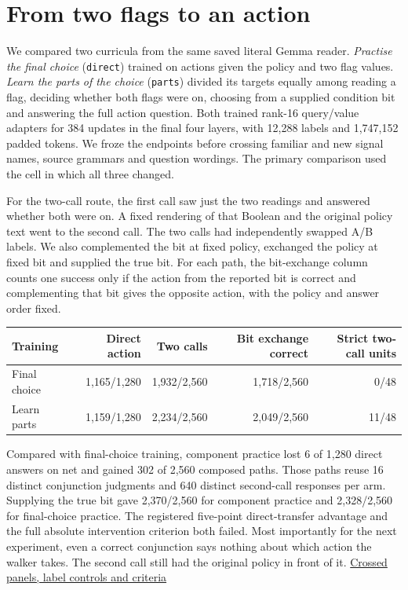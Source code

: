 \documentclass[11pt]{article}
\begin{document}
\section{From two flags to an action}

We compared two curricula from the same saved literal Gemma reader. \emph{Practise the final choice} (\texttt{direct}) trained on actions given the policy and two flag values. \emph{Learn the parts of the choice} (\texttt{parts}) divided its targets equally among reading a flag, deciding whether both flags were on, choosing from a supplied condition bit and answering the full action question. Both trained rank-16 query/value adapters for 384 updates in the final four layers, with 12,288 labels and 1,747,152 padded tokens. We froze the endpoints before crossing familiar and new signal names, source grammars and question wordings. The primary comparison used the cell in which all three changed.

For the two-call route, the first call saw just the two readings and answered whether both were on. A fixed rendering of that Boolean and the original policy text went to the second call. The two calls had independently swapped A/B labels. We also complemented the bit at fixed policy, exchanged the policy at fixed bit and supplied the true bit. For each path, the bit-exchange column counts one success only if the action from the reported bit is correct and complementing that bit gives the opposite action, with the policy and answer order fixed.

\begin{center}
\small\renewcommand{\arraystretch}{1.15}
\begin{tabular}{@{}lrrrr@{}}
\toprule
Training & Direct action & Two calls & Bit exchange correct & Strict two-call units \\
\midrule
Final choice & 1,165/1,280 & 1,932/2,560 & 1,718/2,560 & 0/48 \\
Learn parts & 1,159/1,280 & 2,234/2,560 & 2,049/2,560 & 11/48 \\
\bottomrule
\end{tabular}
\end{center}

Compared with final-choice training, component practice lost 6 of 1,280 direct answers on net and gained 302 of 2,560 composed paths. Those paths reuse 16 distinct conjunction judgments and 640 distinct second-call responses per arm. Supplying the true bit gave 2,370/2,560 for component practice and 2,328/2,560 for final-choice practice. The registered five-point direct-transfer advantage and the full absolute intervention criterion both failed. Most importantly for the next experiment, even a correct conjunction says nothing about which action the walker takes. The second call still had the original policy in front of it. \href{https://github.com/RyoSpiralArchitect/self-fold/blob/v1.0.0/provenance/two_flags_20261104/RESULTS.md}{Crossed panels, label controls and criteria}
\end{document}
